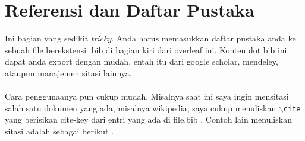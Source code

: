 \documentclass{article}
\begin{document}
\begin{table}[h]
\caption{Contoh Tabel}
\label{tab-contoh}
\centering
{}
\end{table}

\section{Referensi dan Daftar Pustaka}
Ini bagian yang sedikit \textit{tricky}. Anda harus memasukkan daftar pustaka anda ke sebuah file berekstensi .bib di bagian kiri dari overleaf ini. Konten dot bib ini dapat anda export dengan mudah, entah itu dari google scholar, mendeley, ataupun manajemen sitasi lainnya.\\\\
Cara penggunaanya pun cukup mudah. Misalnya saat ini saya ingin mensitasi salah satu dokumen yang ada, misalnya wikipedia, saya cukup menuliskan $\backslash${\tt{cite}} yang berisikan cite-key dari entri yang ada di file.bib \cite{Wikipedia_contributors2021-bb}. Contoh lain menuliskan sitasi adalah sebagai berikut \cite{Name2018-hd}.

\newpage
\end{document}

